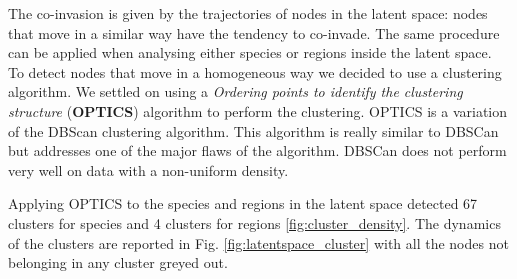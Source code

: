 \documentclass[mscthesis]{usiinfthesis}
\begin{document}
The co-invasion is given by the trajectories of nodes in the latent space: nodes that move in a similar way have the tendency to co-invade. The same procedure can be applied when analysing either species or regions inside the latent space. To detect nodes that move in a homogeneous way we decided to use a clustering algorithm. We settled on using a \textit{Ordering points to identify the clustering structure} (\textbf{OPTICS}) algorithm to perform the clustering. OPTICS is a variation of the DBScan clustering algorithm. This algorithm is really similar to DBSCan but addresses one of the major flaws of the algorithm. DBSCan does not perform very well on data with a non-uniform density. 

Applying OPTICS to the species and regions in the latent space detected 67 clusters for species and 4 clusters for regions \ref{fig:cluster_density}. The dynamics of the clusters are reported in Fig. \ref{fig:latentspace_cluster} with all the nodes not belonging in any cluster greyed out.
\end{document}
